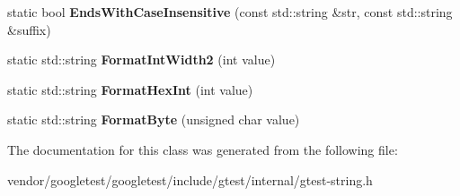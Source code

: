 \begin{DoxyCompactItemize}
\item 
static bool {\bfseries Ends\+With\+Case\+Insensitive} (const std\+::string \&str, const std\+::string \&suffix)\hypertarget{classtesting_1_1internal_1_1String_a3de1df085eddc89ef3f3833c67aee3fe}{}\label{classtesting_1_1internal_1_1String_a3de1df085eddc89ef3f3833c67aee3fe}

\item 
static std\+::string {\bfseries Format\+Int\+Width2} (int value)\hypertarget{classtesting_1_1internal_1_1String_a51cab855f7ec6091e5886b6be5598ca2}{}\label{classtesting_1_1internal_1_1String_a51cab855f7ec6091e5886b6be5598ca2}

\item 
static std\+::string {\bfseries Format\+Hex\+Int} (int value)\hypertarget{classtesting_1_1internal_1_1String_a7bedf4780e0c938d203b73ddb17ff490}{}\label{classtesting_1_1internal_1_1String_a7bedf4780e0c938d203b73ddb17ff490}

\item 
static std\+::string {\bfseries Format\+Byte} (unsigned char value)\hypertarget{classtesting_1_1internal_1_1String_ab3555eeb6abe4b7c6f63d865af10379d}{}\label{classtesting_1_1internal_1_1String_ab3555eeb6abe4b7c6f63d865af10379d}

\end{DoxyCompactItemize}


The documentation for this class was generated from the following file\+:\begin{DoxyCompactItemize}
\item 
vendor/googletest/googletest/include/gtest/internal/gtest-\/string.\+h\end{DoxyCompactItemize}
